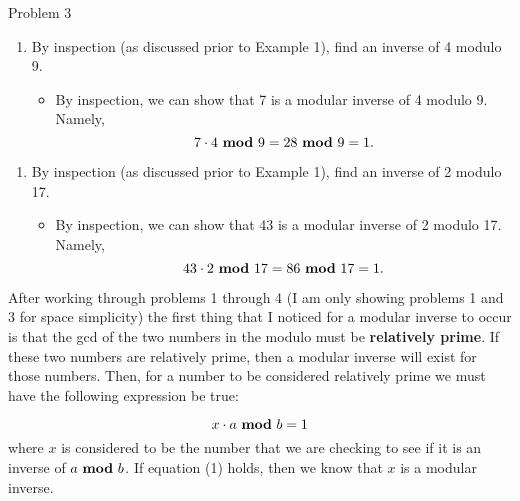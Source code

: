 \begin{problem}{Problem 3}
    \begin{highlight}[Solution - \# 3]
        \begin{enumerate}[start = 3]
            \item By inspection (as discussed prior to Example 1), find an inverse of 4 modulo 9.
            \begin{itemize}
                \item By inspection, we can show that 7 is a modular inverse of 4 modulo 9. Namely,
                \begin{equation*}
                    7 \cdot 4 \text{ \textbf{mod} } 9 = 28 \text{ \textbf{mod} } 9 = 1.
                \end{equation*}
            \end{itemize}
        \end{enumerate}
    \end{highlight}

    \begin{highlight}[Solution - \#4]
        \begin{enumerate}[start = 4]
            \item By inspection (as discussed prior to Example 1), find an inverse of 2 modulo 17.
            \begin{itemize}
                \item By inspection, we can show that 43 is a modular inverse of 2 modulo 17. Namely,
                \begin{equation*}
                    43 \cdot 2 \text{ \textbf{mod} } 17 = 86 \text{ \textbf{mod} } 17 = 1.
                \end{equation*}
            \end{itemize}
        \end{enumerate}
    \end{highlight}

    \begin{highlight}[Synopsis]
        After working through problems 1 through 4 (I am only showing problems 1 and 3 for space simplicity) the first thing that I noticed for a modular inverse to occur is that the gcd of the two
        numbers in the modulo must be \textbf{relatively prime}. If these two numbers are relatively prime, then a modular inverse will exist for those numbers. Then, for a number to be considered
        relatively prime we must have the following expression be true:

        \setcounter{equation}{0}
        \begin{equation}
            x \cdot a \text{ \textbf{mod} } b = 1
        \end{equation}
        where $x$ is considered to be the number that we are checking to see if it is an inverse of $a \text{ \textbf{mod} } b$. If equation (1) holds, then we know that $x$ is a modular inverse.


\end{highlight}
\end{problem}
